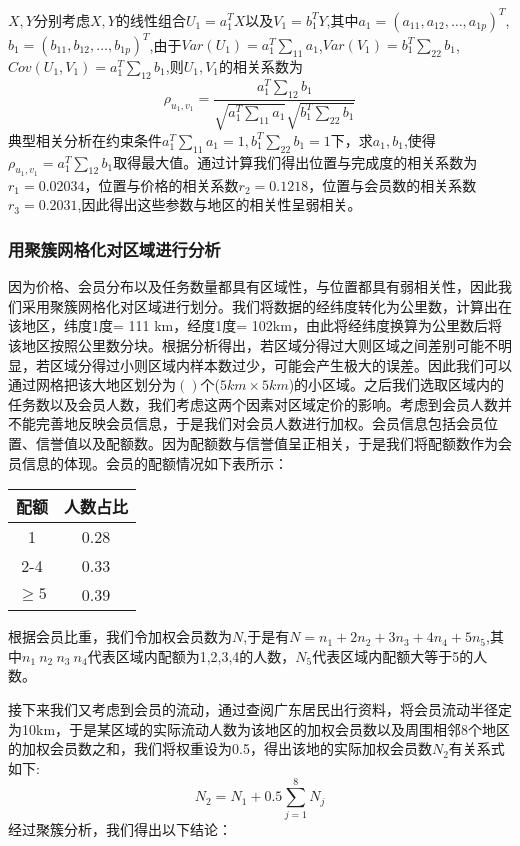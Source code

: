 \documentclass{ctexart}
\begin{document}
$X,Y$分别考虑$X,Y$的线性组合$U_1=a^{T}_{1}X$以及$V_1=b^{T}_{1}Y$,其中$a_1=(a_{11},a_{12},\dots,a_{1p})^T$,$b_1=(b_{11},b_{12},\dots,b_{1p})^T$,由于$Var(U_1)=a_{1}^{T}\sum_{11} a_1$,$Var(V_1)=b_{1}^{T}\sum_{22} b_1$,$Cov(U_1,V_1)=a_{1}^{T}\sum_{12} b_1$,则$U_1,V_1$的相关系数为$$\rho_{u_1,v_1}=\frac{a_{1}^{T}\sum_{12} b_1}{\sqrt{a_{1}^{T}\sum_{11} a_1} \sqrt{b_{1}^{T}\sum_{22} b_1}}$$
典型相关分析在约束条件$a_{1}^{T}\sum_{11} a_1=1,b_{1}^{T}\sum_{22} b_1=1$下，求$a_1,b_1$,使得
$\rho_{u_1,v_1}={a_{1}^{T}\sum_{12} b_1}$取得最大值。通过计算我们得出位置与完成度的相关系数为$r_1=0.02034$，位置与价格的相关系数$r_2=0.1218$，位置与会员数的相关系数$r_3=0.2031$,因此得出这些参数与地区的相关性呈弱相关。
\subsubsection{用聚簇网格化对区域进行分析}
因为价格、会员分布以及任务数量都具有区域性，与位置都具有弱相关性，因此我们采用聚簇网格化对区域进行划分。我们将数据的经纬度转化为公里数，计算出在该地区，纬度1度= 111 km，经度1度= 102km，由此将经纬度换算为公里数后将该地区按照公里数分块。根据分析得出，若区域分得过大则区域之间差别可能不明显，若区域分得过小则区域内样本数过少，可能会产生极大的误差。因此我们可以通过网格把该大地区划分为$()$个($5km\times5km$)的小区域。之后我们选取区域内的任务数以及会员人数，我们考虑这两个因素对区域定价的影响。考虑到会员人数并不能完善地反映会员信息，于是我们对会员人数进行加权。会员信息包括会员位置、信誉值以及配额数。因为配额数与信誉值呈正相关，于是我们将配额数作为会员信息的体现。会员的配额情况如下表所示：
\begin{table}[htbp]
\centering
\begin{tabular}{|c|c|}
\hline
配额&人数占比\\
\hline
1 &0.28\\
\hline
2-4&0.33\\
\hline
$\ge5$&0.39\\
\hline
\end{tabular}
\end{table}
\newpage
根据会员比重，我们令加权会员数为$N$,于是有$N=n_1+2n_2+3n_3+4n_4+5n_5$,其中$n_1\ n_2\ n_3\ n_4$代表区域内配额为1,2,3,4的人数，$N_5$代表区域内配额大等于5的人数。

接下来我们又考虑到会员的流动，通过查阅广东居民出行资料，将会员流动半径定为10km，于是某区域的实际流动人数为该地区的加权会员数以及周围相邻8个地区的加权会员数之和，我们将权重设为0.5，得出该地的实际加权会员数$N_2$有关系式如下:$$N_2=N_1+0.5\sum_{j=1}^{8}N_j$$
经过聚簇分析，我们得出以下结论：
\end{document}
